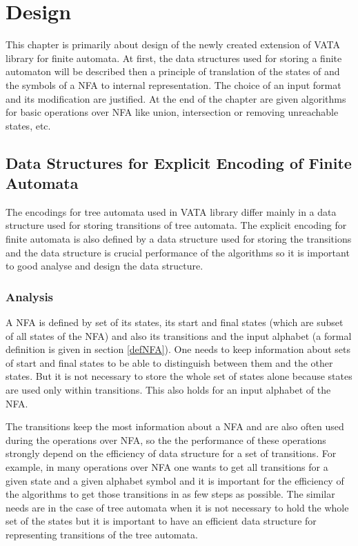 \chapter{Design}
\label{design}
This chapter is primarily about design of the newly created extension of VATA library for finite automata. 
At first, the data structures used for storing a finite automaton will be described then a principle of translation of the states of and the symbols of a NFA 
to internal representation. The choice of an input format and its modification are justified. At the end of the chapter are given 
algorithms for basic operations over NFA like union, intersection or removing unreachable states, etc.

\section{Data Structures for Explicit Encoding of Finite Automata}
The encodings for tree automata used in VATA library differ mainly in a data structure used for storing transitions of tree automata. The explicit encoding
for finite automata is also defined by a data structure used for storing the transitions and 
the data structure is crucial performance of the algorithms so it is important to good analyse and design the data structure. 

\label{data structure explicit}
\subsection{Analysis}
\label{analysis}
A NFA is defined by set of its states, its start and final states (which are subset of all states of the NFA) and also its
transitions and the input alphabet (a formal definition is given in section \ref{defNFA}). 
One needs to keep information about sets of start and final states to be able to distinguish
between them and the other states. But it is not necessary to store the whole set of states alone because states are used only within transitions. 
This also holds for an input alphabet of the NFA. 

The transitions keep the most information about a NFA and are also often used
during the operations over NFA, so the the performance of these operations strongly depend on the efficiency of data structure for a set of transitions. 
For example, in many operations over NFA one wants to get all transitions for a given state and a given alphabet symbol and it is important for 
the efficiency of the algorithms to get those transitions in as few steps as possible. The similar needs are in the case
of tree automata when it is not necessary to hold the whole set of the states but it is important to have an efficient data structure for representing 
transitions of the tree automata.

